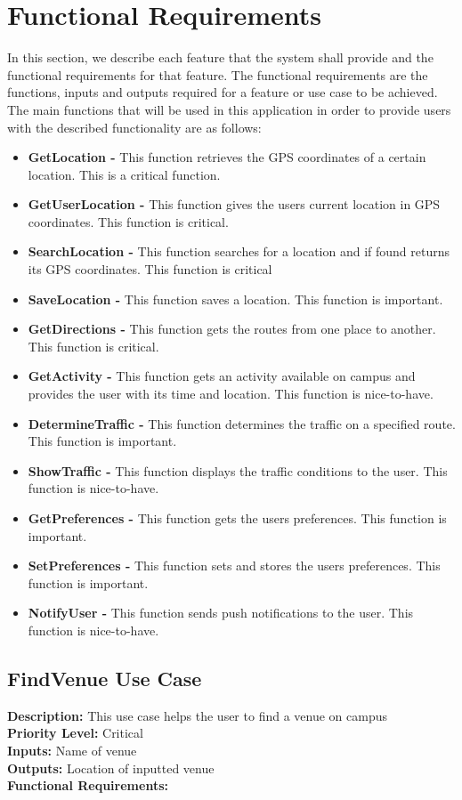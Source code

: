 \documentclass[a4paper,12pt]{article}
\begin{document}
\section{Functional Requirements}
In this section, we describe each feature that the system shall provide and the functional requirements for that feature. The functional requirements are the functions, inputs and outputs required for a feature or use case to be achieved. The main functions that will be used in this application in order to provide users with the described functionality are as follows:
\begin{itemize}
\item \textbf{GetLocation -} This function retrieves the GPS coordinates of a certain location. This is a critical function.
\item \textbf{GetUserLocation -} This function gives the users current location in GPS coordinates. This function is critical.
\item \textbf{SearchLocation -} This function searches for a location and if found returns its GPS coordinates. This function is critical
\item \textbf{SaveLocation -} This function saves a location. This function is important.
\item \textbf{GetDirections -} This function gets the routes from one place to another. This function is critical.
\item \textbf{GetActivity -} This function gets an activity available on campus and provides the user with its time and location. This function is nice-to-have.
\item \textbf{DetermineTraffic -} This function determines the traffic on a specified route. This function is important.
\item \textbf{ShowTraffic -} This function displays the traffic conditions to the user. This function is nice-to-have.
\item \textbf{GetPreferences -} This function gets the users preferences. This function is important.
\item \textbf{SetPreferences -} This function sets and stores the users preferences. This function is important.
\item \textbf{NotifyUser -} This function sends push notifications to the user. This function is nice-to-have.
\end{itemize}

\subsection{FindVenue Use Case}
\textbf{Description: } This use case helps the user to find a venue on campus\\
\textbf{Priority Level: } Critical\\
\textbf{Inputs:} Name of venue\\
\textbf{Outputs:} Location of inputted venue\\
\textbf{Functional Requirements: }\\
\end{document}
